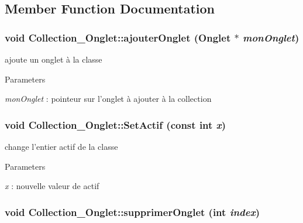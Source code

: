 \subsection{Member Function Documentation}
\hypertarget{classCollection__Onglet_a5abc570f57bbc5786de4bd2db933b059}{
\subsubsection[{ajouterOnglet}]{\setlength{\rightskip}{0pt plus 5cm}void Collection\_\-Onglet::ajouterOnglet ({\bf Onglet} $\ast$ {\em monOnglet})}}
\label{classCollection__Onglet_a5abc570f57bbc5786de4bd2db933b059}


ajoute un onglet à la classe 


\begin{DoxyParams}{Parameters}
\item[{\em monOnglet}]: pointeur sur l'onglet à ajouter à la collection \end{DoxyParams}
\hypertarget{classCollection__Onglet_a56c620f3b31a3d6a0b3b20a9fa456739}{
\subsubsection[{SetActif}]{\setlength{\rightskip}{0pt plus 5cm}void Collection\_\-Onglet::SetActif (const int {\em x})}}
\label{classCollection__Onglet_a56c620f3b31a3d6a0b3b20a9fa456739}


change l'entier actif de la classe 


\begin{DoxyParams}{Parameters}
\item[{\em x}]: nouvelle valeur de actif \end{DoxyParams}
\hypertarget{classCollection__Onglet_aa3cc4c74f4a47cd04f3dfa5d46c8a322}{
\subsubsection[{supprimerOnglet}]{\setlength{\rightskip}{0pt plus 5cm}void Collection\_\-Onglet::supprimerOnglet (int {\em index})}}
\label{classCollection__Onglet_aa3cc4c74f4a47cd04f3dfa5d46c8a322}


